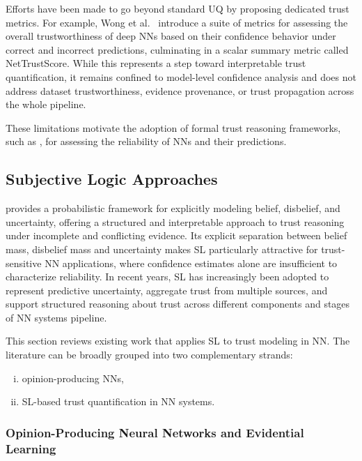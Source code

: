 Efforts have been made to go beyond standard UQ by proposing dedicated trust metrics. For example, Wong et al.~\cite{wong2021reallytrustyousimple} introduce a suite of metrics for assessing the overall trustworthiness of deep \acp{NN} based on their confidence behavior under correct and incorrect predictions, culminating in a scalar summary metric called NetTrustScore. While this represents a step toward interpretable trust quantification, it remains confined to model-level confidence analysis and does not address dataset trustworthiness, evidence provenance, or trust propagation across the whole pipeline. 

These limitations motivate the adoption of formal trust reasoning frameworks, such as , for assessing the reliability of \acp{NN} and their predictions.
\subsection{Subjective Logic Approaches}
\label{sec:sl_approaches}
 provides a probabilistic framework for explicitly modeling belief, disbelief, and uncertainty, offering a structured and interpretable approach to trust reasoning under incomplete and conflicting evidence. Its explicit separation between belief mass, disbelief mass and uncertainty makes \ac{SL} particularly attractive for trust-sensitive \ac{NN} applications, where confidence estimates alone are insufficient to characterize reliability. In recent years, \ac{SL} has increasingly been adopted to represent predictive uncertainty, aggregate trust from multiple sources, and support structured reasoning about trust across different components and stages of \ac{NN} systems pipeline.

This section reviews existing work that applies \ac{SL} to trust modeling in \ac{NN}. The literature can be broadly grouped into two complementary strands:

\begin{enumerate}[(i)]
    \item opinion-producing \acp{NN},
    \item SL-based trust quantification in \ac{NN} systems.
\end{enumerate}

\subsubsection{Opinion-Producing Neural Networks and Evidential Learning}


